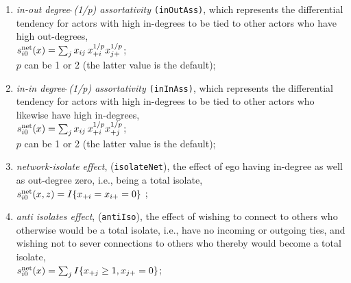 \documentclass[a4paper,fleqn,11pt]{article}
\newcommand{\+}{\, + \,}
\newcommand{\rs}{{\sf RSiena}}
\newcommand{\RS}{{\sf RSiena }}
\newcommand{\vit}{\theenumi}
\newcounter{savenumi}
\begin{document}
\begin{enumerate}
 \item {\em in-out degree$\,\hat{\ }$(1/p) assortativity}
 \texttt{(inOutAss)},
 which represents the differential tendency for actors with high in-degrees
 to be tied to other actors who have high out-degrees,\\
 $s^{\rm net}_{i\vit}(x) = \sum_j x_{ij}\, {x_{+i}^{1/p}} {x_{j+}^{1/p}} $;\\
 $p$ can be 1 or 2 (the latter value is the default);

 \item {\em in-in degree$\,\hat{\ }$(1/p) assortativity}
 \texttt{(inInAss)},
 which represents the differential tendency for actors with high in-degrees
 to be tied to other actors who likewise have high in-degrees,\\
 $s^{\rm net}_{i\vit}(x) = \sum_j x_{ij}\, {x_{+i}^{1/p}} {x_{+j}^{1/p}} $;\\
 $p$ can be 1 or 2 (the latter value is the default);

\item \emph{network-isolate effect}, (\texttt{isolateNet}), the effect of ego having
      in-degree as well as out-degree zero, i.e., being a total isolate,\\
 $s^{\rm net}_{i\vit}(x, z) =   I\{x_{+i} = x_{i+} = 0 \}  $ ;

\item \emph{anti isolates effect}, (\texttt{antiIso}), the effect of
      wishing to connect to others who otherwise would
      be a total isolate, i.e., have no incoming or outgoing
      ties, and wishing not to sever connections to
      others who thereby would become a total isolate,\\
$s^{\rm net}_{i\vit}(x) = \sum_j I\{x_{+j} \geq 1, x_{j+} = 0\} $;\\


\end{enumerate}
\end{document}
